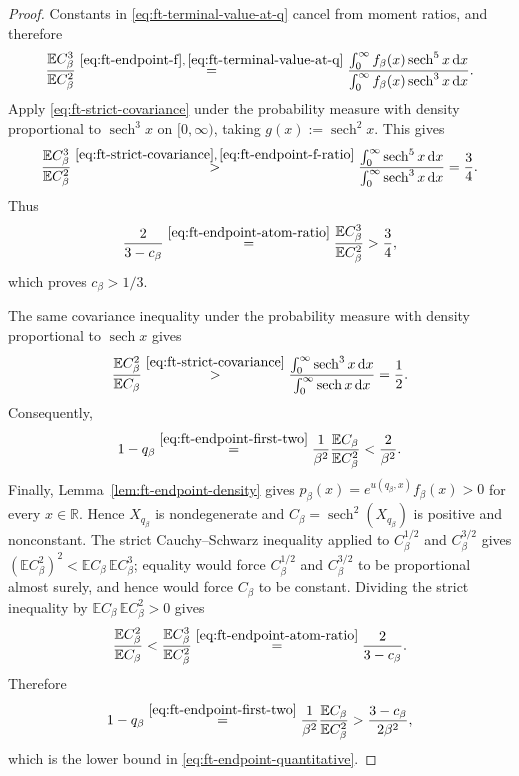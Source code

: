 \documentclass[10pt]{amsart}
\theoremstyle{definition}
\theoremstyle{remark}
\numberwithin{equation}{section}
\newcommand{\R}{\mathbb R}
\newcommand{\E}{\mathbb E}
\newcommand{\1}{\mathbf 1}
\newcommand{\sech}{\operatorname{sech}}
\newcommand{\dd}{\,\mathrm d}
\newcommand{\stackref}[2]{\stackrel{#2}{#1}}
\begin{document}
\begin{proof}
Constants in \eqref{eq:ft-terminal-value-at-q} cancel from moment ratios, and therefore
\begin{equation}
 \frac{\E C_\beta^3}{\E C_\beta^2}
 \stackref{=}{\eqref{eq:ft-endpoint-f},\,\eqref{eq:ft-terminal-value-at-q}}
 \frac{\int_0^\infty f_\beta(x)\sech^5x\dd x}
        {\int_0^\infty f_\beta(x)\sech^3x\dd x}.
 \label{eq:ft-endpoint-f-ratio}
\end{equation}
Apply \eqref{eq:ft-strict-covariance} under the probability measure with density proportional to $\sech^3x$ on $[0,\infty)$, taking $g(x):=\sech^2x$.  This gives
\begin{equation*}
 \frac{\E C_\beta^3}{\E C_\beta^2}
 \stackref{>}{\eqref{eq:ft-strict-covariance},\,\eqref{eq:ft-endpoint-f-ratio}}
 \frac{\int_0^\infty\sech^5x\dd x}
         {\int_0^\infty\sech^3x\dd x}
 =\frac34.
\end{equation*}
Thus
\begin{equation*}
 \frac2{3-c_\beta}
 \stackref{=}{\eqref{eq:ft-endpoint-atom-ratio}}
 \frac{\E C_\beta^3}{\E C_\beta^2}>\frac34,
\end{equation*}
which proves $c_\beta>1/3$.

The same covariance inequality under the probability measure with density proportional to $\sech x$ gives
\begin{equation*}
 \frac{\E C_\beta^2}{\E C_\beta}
 \stackref{>}{\eqref{eq:ft-strict-covariance}}
 \frac{\int_0^\infty\sech^3x\dd x}
         {\int_0^\infty\sech x\dd x}
 =\frac12.
\end{equation*}
Consequently,
\begin{equation*}
 1-q_\beta
 \stackref{=}{\eqref{eq:ft-endpoint-first-two}}
 \frac1{\beta^2}\frac{\E C_\beta}{\E C_\beta^2}
 <\frac2{\beta^2}.
\end{equation*}
Finally, Lemma~\ref{lem:ft-endpoint-density} gives $p_\beta(x)=e^{u(q_\beta,x)}f_\beta(x)>0$ for every $x\in\R$. Hence $X_{q_\beta}$ is nondegenerate and $C_\beta=\sech^2(X_{q_\beta})$ is positive and nonconstant. The strict Cauchy--Schwarz inequality applied to $C_\beta^{1/2}$ and $C_\beta^{3/2}$ gives $(\E C_\beta^2)^2<\E C_\beta\,\E C_\beta^3$; equality would force $C_\beta^{1/2}$ and $C_\beta^{3/2}$ to be proportional almost surely, and hence would force $C_\beta$ to be constant. Dividing the strict inequality by $\E C_\beta\,\E C_\beta^2>0$ gives
\begin{equation*}
 \frac{\E C_\beta^2}{\E C_\beta}
 <\frac{\E C_\beta^3}{\E C_\beta^2}
 \stackref{=}{\eqref{eq:ft-endpoint-atom-ratio}}
 \frac2{3-c_\beta}.
\end{equation*}
Therefore
\begin{equation*}
 1-q_\beta
 \stackref{=}{\eqref{eq:ft-endpoint-first-two}}
 \frac1{\beta^2}\frac{\E C_\beta}{\E C_\beta^2}
 >\frac{3-c_\beta}{2\beta^2},
\end{equation*}
which is the lower bound in \eqref{eq:ft-endpoint-quantitative}.
\end{proof}
\end{document}
